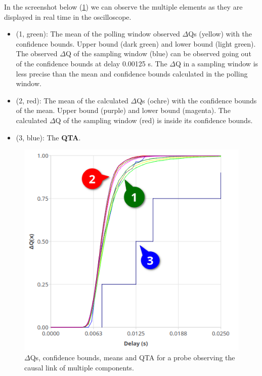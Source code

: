     In the screenshot below (\cref{fig:dq_displ}) we can observe the multiple elements as they are displayed in real time in the oscilloscope.
    \begin{itemize}
        \item (1, green): The mean of the polling window observed $\Delta$Qs (yellow) with the confidence bounds. Upper bound (dark green) and lower bound (light green). The observed $\Delta$Q of the sampling window (blue) can be observed going out of the confidence bounds at delay 0.00125 s. The $\Delta$Q in a sampling window is less precise than the mean and confidence bounds calculated in the polling window.
        \item (2, red): The mean of the calculated $\Delta$Qs (ochre) with the confidence bounds of the mean. Upper bound (purple) and lower bound (magenta). The calculated $\Delta$Q of the sampling window (red) is inside its confidence bounds.
        \item (3, blue): The \textbf{QTA}.
    \end{itemize}
     \begin{figure}[H]
        \begin{center}
            \includegraphics[scale = 0.7]{img/overload_2/fired_sampleb.png}
        \end{center}
         \caption{$\Delta$Qs, confidence bounds, means and QTA for a probe observing the causal link of multiple components.}
         \label{fig:dq_displ}
    \end{figure}
        

